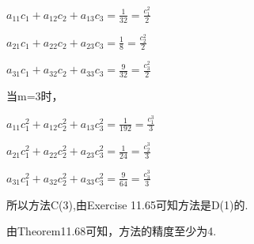 \documentclass[UTF8]{ctexart}
\begin{document}
$a_{11}c_1 + a_{12}c_2 + a_{13}c_3 = \frac{1}{32}=\frac{c_1^2}{2}$

$a_{21}c_1 + a_{22}c_2 + a_{23}c_3 = \frac{1}{8}=\frac{c_2^2}{2}$

$a_{31}c_1 + a_{32}c_2 + a_{33}c_3 = \frac{9}{32}=\frac{c_3^2}{2}$

当m=3时，

$a_{11}c_1^2 + a_{12}c_2^2 + a_{13}c_3^2 = \frac{1}{192}=\frac{c_1^3}{3}$

$a_{21}c_1^2 + a_{22}c_2^2 + a_{23}c_3^2 = \frac{1}{24}=\frac{c_2^3}{3}$

$a_{31}c_1^2 + a_{32}c_2^2 + a_{33}c_3^2 = \frac{9}{64}=\frac{c_3^3}{3}$

所以方法C(3),由Exercise 11.65可知方法是D(1)的.

由Theorem11.68可知，方法的精度至少为4.










\end{document}
